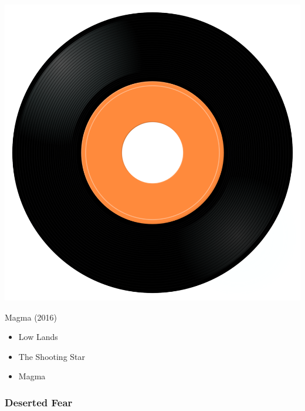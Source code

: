 \begin{minipage}[t]{0.25\textwidth}\vspace{0pt}
\captionsetup{type=figure}
\includegraphics[width=\textwidth]{Images/cover.png}
\caption*{Magma (2016)}
\end{minipage}
\begin{minipage}[t]{0.25\textwidth}\vspace{0pt}
\begin{itemize}[nosep,leftmargin=1em,labelwidth=*,align=left]
	\setlength{\itemsep}{0pt}
	\item Low Lands
	\item The Shooting Star
	\item Magma
\end{itemize}
\end{minipage}


\subsubsection{Deserted Fear}

